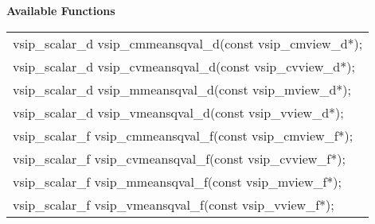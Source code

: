 \\\cvsiplh
\\ \hspace*{.8cm} \vspace*{.1cm} \textbf{Available Functions }
\\ \hspace*{1.1cm} {
\ttfamily
\begin{tabular}[H]{l}
vsip\_scalar\_d vsip\_cmmeansqval\_d(const vsip\_cmview\_d*);\\
vsip\_scalar\_d vsip\_cvmeansqval\_d(const vsip\_cvview\_d*);\\
vsip\_scalar\_d vsip\_mmeansqval\_d(const vsip\_mview\_d*);\\
vsip\_scalar\_d vsip\_vmeansqval\_d(const vsip\_vview\_d*);\\
vsip\_scalar\_f vsip\_cmmeansqval\_f(const vsip\_cmview\_f*);\\
vsip\_scalar\_f vsip\_cvmeansqval\_f(const vsip\_cvview\_f*);\\
vsip\_scalar\_f vsip\_mmeansqval\_f(const vsip\_mview\_f*);\\
vsip\_scalar\_f vsip\_vmeansqval\_f(const vsip\_vview\_f*);\\
\end{tabular}
}
\\\pyjvsiph
{}
